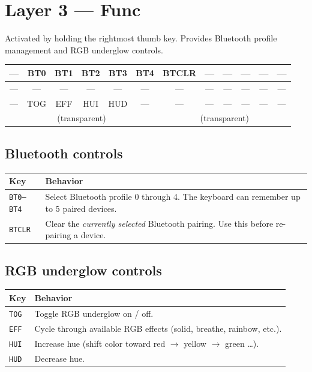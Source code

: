 \documentclass[11pt, letterpaper]{article}
\begin{document}
\section{Layer 3 — Func}

Activated by holding the rightmost thumb key. Provides Bluetooth
profile management and RGB underglow controls.

\begin{center}
\renewcommand{\arraystretch}{1.4}
\begin{tabular}{|c|c|c|c|c|c||c|c|c|c|c|c|}
\hline
--- & BT0 & BT1 & BT2 & BT3 & BT4 & BTCLR & --- & --- & --- & --- & --- \\
\hline
--- & --- & --- & --- & --- & --- & --- & --- & --- & --- & --- & --- \\
\hline
--- & TOG & EFF & HUI & HUD & --- & --- & --- & --- & --- & --- & --- \\
\hline
\multicolumn{6}{|c|}{(transparent)} &
\multicolumn{6}{c|}{(transparent)} \\
\hline
\end{tabular}
\end{center}

\subsection*{Bluetooth controls}

\begin{tabular}{lp{9cm}}
\toprule
\textbf{Key}       & \textbf{Behavior} \\
\midrule
\texttt{BT0--BT4}  & Select Bluetooth profile 0 through 4. The keyboard
                     can remember up to 5 paired devices. \\
\texttt{BTCLR}     & Clear the \emph{currently selected} Bluetooth pairing.
                     Use this before re-pairing a device. \\
\bottomrule
\end{tabular}

\subsection*{RGB underglow controls}

\begin{tabular}{lp{9cm}}
\toprule
\textbf{Key}       & \textbf{Behavior} \\
\midrule
\texttt{TOG}       & Toggle RGB underglow on / off. \\
\texttt{EFF}       & Cycle through available RGB effects (solid, breathe, rainbow, etc.). \\
\texttt{HUI}       & Increase hue (shift color toward red $\to$ yellow $\to$ green \ldots). \\
\texttt{HUD}       & Decrease hue. \\
\bottomrule
\end{tabular}
\end{document}

